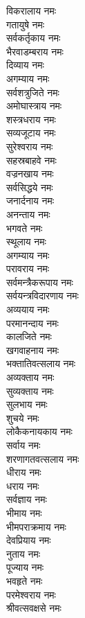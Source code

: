\begin{multicols}{2}
\begin{flushleft}
विकरालाय नमः\\
गतायुषे नमः\\
सर्वकर्तृकाय नमः\\
भैरवाडम्बराय नमः\\
दिव्याय नमः\\
अगम्याय नमः\\
सर्वशत्रुजिते नमः\\
अमोघास्त्राय नमः\\
शस्त्रधराय नमः\hfill{}\\
सव्यजूटाय नमः\\
सुरेश्वराय नमः\\
सहस्रबाहवे नमः\\
वज्रनखाय नमः\\
सर्वसिद्धये नमः\\
जनार्दनाय नमः\\
अनन्ताय नमः\\
भगवते नमः\\
स्थूलाय नमः\\
अगम्याय नमः\hfill{}\\
परावराय नमः\\
सर्वमन्त्रैकरूपाय नमः\\
सर्वयन्त्रविदारणाय नमः\\
अव्ययाय नमः\\
परमानन्दाय नमः\\
कालजिते नमः\\
खगवाहनाय नमः\\
भक्तातिवत्सलाय नमः\\
अव्यक्ताय नमः\\
सुव्यक्ताय नमः\hfill{}\\
सुलभाय नमः\\
शुचये नमः\\
लोकैकनायकाय नमः\\
सर्वाय नमः\\
शरणागतवत्सलाय नमः\\
धीराय नमः\\
धराय नमः\\
सर्वज्ञाय नमः\\
भीमाय नमः\\
भीमपराक्रमाय नमः\hfill{}\\
देवप्रियाय नमः\\
नुताय नमः\\
पूज्याय नमः\\
भवहृते नमः\\
परमेश्वराय नमः\\
श्रीवत्सवक्षसे नमः\\

\end{flushleft}
\end{multicols}
